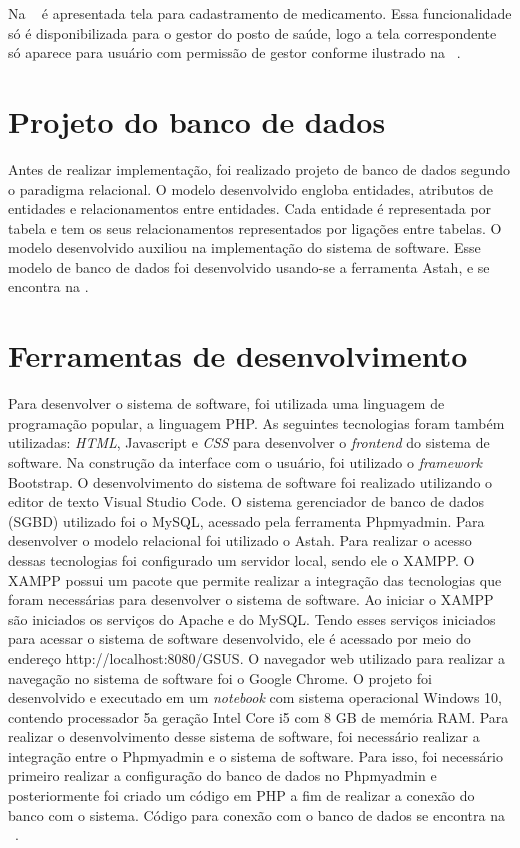 %

Na ~ é apresentada tela para cadastramento de medicamento. Essa funcionalidade só é disponibilizada para o gestor do posto de saúde, logo a tela correspondente só aparece para usuário com permissão de gestor conforme ilustrado na ~. 


\section{Projeto do banco de dados}

%

Antes de realizar implementação, foi realizado projeto de banco de dados segundo o paradigma relacional. O modelo desenvolvido engloba entidades, atributos de entidades e relacionamentos entre entidades. Cada entidade é representada por tabela e tem os seus relacionamentos representados por ligações entre tabelas. 
O modelo desenvolvido auxiliou na implementação do sistema de software. Esse modelo de banco de dados foi desenvolvido usando-se a ferramenta Astah, e se encontra na .

\section{Ferramentas de desenvolvimento}

Para desenvolver o sistema de software, foi utilizada uma linguagem de programação popular, a linguagem PHP. As seguintes tecnologias foram também utilizadas: \emph{\acrfull{HTML}}, Javascript e \emph{\acrfull{CSS}} para desenvolver o \emph{frontend} do sistema de software. Na construção da interface com o usuário, foi utilizado o \emph{framework} Bootstrap. O desenvolvimento do sistema de software foi realizado utilizando o editor de texto Visual Studio Code. O sistema gerenciador de banco de dados (SGBD) utilizado foi o MySQL, acessado pela ferramenta Phpmyadmin. Para desenvolver o modelo relacional foi utilizado o Astah. Para realizar o acesso dessas tecnologias foi configurado um servidor local, sendo ele o XAMPP. O XAMPP possui um pacote que permite realizar a integração das tecnologias que foram necessárias para desenvolver o sistema de software. Ao iniciar o XAMPP são iniciados os serviços do Apache e do MySQL. Tendo esses serviços iniciados para acessar o sistema de software desenvolvido, ele é acessado por meio do endereço http://localhost:8080/GSUS. O navegador web utilizado para realizar a navegação no sistema de software foi o Google Chrome. O projeto foi desenvolvido e executado em um \emph{notebook} com sistema operacional Windows 10, contendo processador 5a geração Intel Core i5 com 8 GB de memória RAM. 
Para realizar o desenvolvimento desse sistema de software, foi necessário realizar a integração entre o Phpmyadmin e o sistema de software. Para isso, foi necessário primeiro realizar a configuração do banco de dados no Phpmyadmin e posteriormente foi criado um código em PHP a fim de realizar a conexão do banco com o sistema. Código para conexão com o banco de dados se encontra na ~.

%




